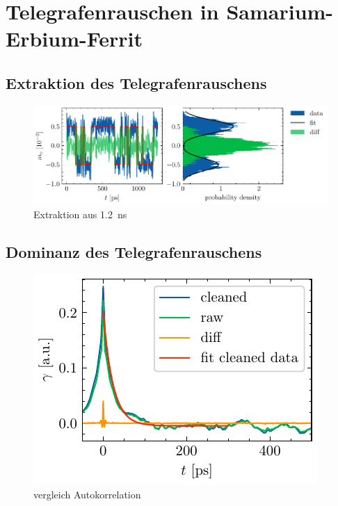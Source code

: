 \documentclass[main.tex]{subfiles}
\begin{document}
\newpage
\section{Telegrafenrauschen in Samarium-Erbium-Ferrit}

\subsection{Extraktion des Telegrafenrauschens}

\begin{figure}[h]
    \centering
    \includegraphics{bilder/plots/Bz_0mT/mc_fit_hist_part2_26.03meV.pdf}
    \caption{Extraktion aus \SI{1,2}{\nano\s}}\label{fig:Extraktion-ausschnitt}
\end{figure}


\subsection*{Dominanz des Telegrafenrauschens}

\begin{figure}[h]
    \centering
    \includegraphics{bilder/plots/Bz_0mT/autocorr_26.03meV.pdf}
    \caption{vergleich Autokorrelation}\label{fig:autocorr}
\end{figure}
\end{document}
